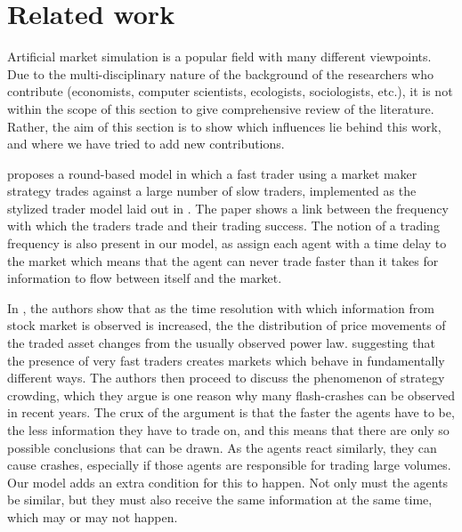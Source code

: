 \section{Related work}\label{section_relatedWork}

Artificial market simulation is a popular field with many different viewpoints. Due to the multi-disciplinary nature of the background of the researchers who contribute (economists, computer scientists, ecologists, sociologists, etc.), it is not within the scope of this section to give  comprehensive review of the literature. Rather, the aim of this section is to show which influences lie behind this work, and where we have tried to add new contributions.

\cite{chiWang} proposes a round-based model in which a fast trader using a market maker strategy trades against a large number of slow traders, implemented as the stylized trader model laid out in \cite{theImpactOfHeterogenous}. The paper shows a link between the frequency with which the traders trade and their trading success. The notion of a trading frequency is also present in our model, as assign each agent with a time delay to the market which means that the agent can never trade faster than it takes for information to flow between itself and the market.

In \cite{financialBlackSwans}, the authors show that as the time resolution with which information from stock market is observed is increased, the the distribution of price movements of the traded asset changes from the usually observed power law.  suggesting that the presence of very fast traders creates markets which behave in fundamentally different ways. The authors then proceed to discuss the phenomenon of strategy crowding, which they argue is one reason why many flash-crashes can be observed in recent years. The crux of the argument is that the faster the agents have to be, the less information they have to trade on, and this means that there are only so possible conclusions that can be drawn. As the agents react similarly, they can cause crashes, especially if those agents are responsible for trading large volumes. Our model adds an extra condition for this to happen. Not only must the agents be similar, but they must also receive the same information at the same time, which may or may not happen.



